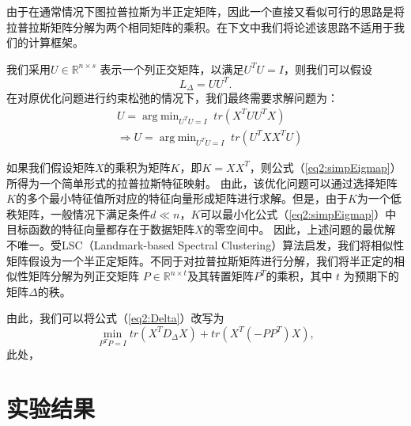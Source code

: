 由于在通常情况下图拉普拉斯为半正定矩阵，因此一个直接又看似可行的思路是将拉普拉斯矩阵分解为两个相同矩阵的乘积。在下文中我们将论述该思路不适用于我们的计算框架。

我们采用$U\in \mathbb{R}^{n\times s}$ 表示一个列正交矩阵，以满足$U^TU = I$，则我们可以假设
\begin{equation}
	L_\Delta = UU^T.
\end{equation}
在对原优化问题进行约束松弛的情况下，我们最终需要求解问题为：
\begin{equation}
	\begin{split}
		&U = \mathop{\mathrm{arg\;min}}_{U^TU=I}\; tr(X^TUU^TX) \\
		&\Rightarrow U = \mathop{\mathrm{arg\;min}}_{U^TU=I} \;tr(U^TXX^TU)
	\end{split}
	\label{eq2:simpEigmap}
\end{equation}

如果我们假设矩阵$X$的乘积为矩阵$K$，即$K = XX^T$，则公式（\ref{eq2:simpEigmap}）所得为一个简单形式的拉普拉斯特征映射\cite{belkin2001laplacian}。
由此，该优化问题可以通过选择矩阵$K$的多个最小特征值所对应的特征向量形成矩阵进行求解。但是，由于$K$为一个低秩矩阵，一般情况下满足条件$d\ll n$，$K$可以最小化公式（\ref{eq2:simpEigmap}）中目标函数的特征向量都存在于数据矩阵$X$的零空间中。
因此，上述问题的最优解不唯一。受LSC（Landmark-based Spectral Clustering）算法\cite{chen2011large}启发，我们将相似性矩阵假设为一个半正定矩阵。不同于对拉普拉斯矩阵进行分解，我们将半正定的相似性矩阵分解为列正交矩阵 $P\in \mathbb{R}^{n\times t}$及其转置矩阵$P^T$的乘积，其中 $t$ 为预期下的矩阵$\Delta$的秩。

由此，我们可以将公式（\ref{eq2:Delta}）改写为
\begin{equation}
	\mathop{\mathrm{min}}_{P^TP=I} tr(X^TD_\Delta X)+tr(X^T(-PP^T)X),
	\label{eq2:XLX}
\end{equation}
此处，

\section{实验结果}
\label{sec2:Exp}